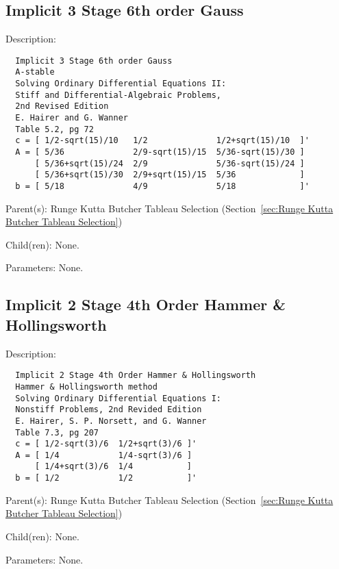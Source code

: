 \subsection{Implicit 3 Stage 6th order Gauss}
\label{sec:Implicit 3 Stage 6th order Gauss}

\begin{list}{}
  {\setlength{\leftmargin}{1.0in}
   \setlength{\labelwidth}{0.75in}
   \setlength{\labelsep}{0.125in}}
  \item[Description:]
\begin{verbatim}
  Implicit 3 Stage 6th order Gauss
  A-stable
  Solving Ordinary Differential Equations II:
  Stiff and Differential-Algebraic Problems,
  2nd Revised Edition
  E. Hairer and G. Wanner
  Table 5.2, pg 72
  c = [ 1/2-sqrt(15)/10   1/2              1/2+sqrt(15)/10  ]'
  A = [ 5/36              2/9-sqrt(15)/15  5/36-sqrt(15)/30 ]
      [ 5/36+sqrt(15)/24  2/9              5/36-sqrt(15)/24 ]
      [ 5/36+sqrt(15)/30  2/9+sqrt(15)/15  5/36             ]
  b = [ 5/18              4/9              5/18             ]'
\end{verbatim}
  \item[Parent(s):]
    Runge Kutta Butcher Tableau Selection (Section~\ref{sec:Runge Kutta Butcher Tableau Selection})
  \item[Child(ren):]
    None. 
  \item[Parameters:]
    None. 
\end{list}

\subsection{Implicit 2 Stage 4th Order Hammer \& Hollingsworth}
\label{sec:Implicit 2 Stage 4th Order Hammer and Hollingsworth}

\begin{list}{}
  {\setlength{\leftmargin}{1.0in}
   \setlength{\labelwidth}{0.75in}
   \setlength{\labelsep}{0.125in}}
  \item[Description:]
\begin{verbatim}
  Implicit 2 Stage 4th Order Hammer & Hollingsworth
  Hammer & Hollingsworth method
  Solving Ordinary Differential Equations I:
  Nonstiff Problems, 2nd Revided Edition
  E. Hairer, S. P. Norsett, and G. Wanner
  Table 7.3, pg 207
  c = [ 1/2-sqrt(3)/6  1/2+sqrt(3)/6 ]'
  A = [ 1/4            1/4-sqrt(3)/6 ]
      [ 1/4+sqrt(3)/6  1/4           ]
  b = [ 1/2            1/2           ]'
\end{verbatim}
  \item[Parent(s):]
    Runge Kutta Butcher Tableau Selection (Section~\ref{sec:Runge Kutta Butcher Tableau Selection})
  \item[Child(ren):]
    None. 
  \item[Parameters:]
    None. 
\end{list}

